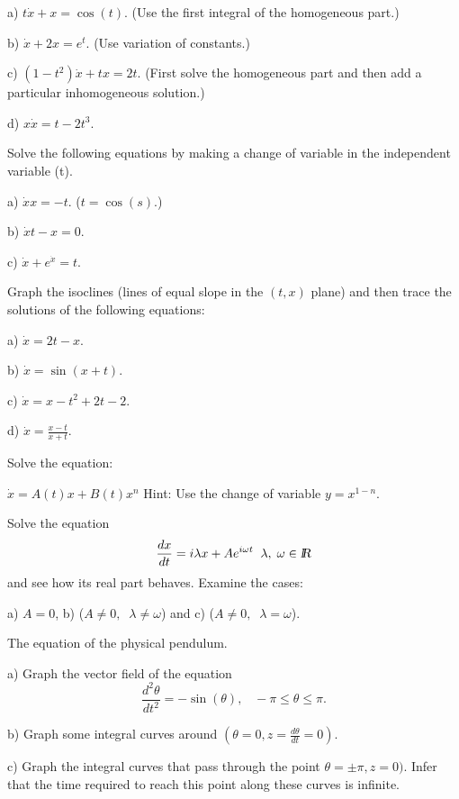 a) $t \dot{x} + x = \cos(t)$. (Use the first integral of the homogeneous part.)

b) $\dot{x} + 2x = e^t$. (Use variation of constants.)

c) $(1-t^2)\dot{x} + tx = 2t$. (First solve the homogeneous part and then
add a particular inhomogeneous solution.)

d) $x \dot{x} = t - 2t^3$.
\epro

\bpro[Kiseliov]
Solve the following equations by making a change of variable in
the independent variable (t).

a) $\dot{x}x = -t$. ($t = \cos(s)$.)

b) $\dot{x}t - x =0$.

c) $\dot{x} + e^{\dot{x}} = t$.
\epro

\bpro[Kiseliov]
Graph the isoclines (lines of equal slope in the $(t,x)$ plane)
and then trace the solutions of the following equations:

a) $\dot{x} = 2t - x$.

b) $\dot{x} = \sin(x+t)$.

c) $\dot{x} = x -t^2 + 2t -2$.

d) $\dot{x} = \frac{x-t}{x+t}$.
\epro

\bpro 
Solve the equation:

$\dot{x} = A(t)x + B(t)x^n$ Hint: Use the change of variable $y = x^{1-n}$.
\epro

\bpro 
Solve the equation
\begin{equation}
  \label{eq:osc}
  \frac{dx}{dt} = i\lambda x + A e^{i \omega t} \;\; \lambda, \; \omega \in \mbox{\sl {l$\!\!\!\;\:\!$R}}
\end{equation}
%
and see how its real part behaves.
Examine the cases: 

a) $A=0$, 
b) ($A \neq 0, \;\; \lambda \neq \omega$) and
c) ($A \neq 0, \;\; \lambda = \omega$).
\epro

\bpro 
The equation of the physical pendulum.

a) Graph the vector field of the equation
\begin{equation}
  \label{eq:pendulo_fisico}
  \frac{d^2\theta}{dt^2} = -\sin(\theta), \;\;\;-\pi \leq \theta \leq \pi. 
\end{equation}

b) Graph some integral curves around 
$(\theta=0, z=\frac{d\theta}{dt} = 0)$.

c) Graph the integral curves that pass through the point
$\theta = \pm \pi, z=0)$. Infer that the time required 
to reach this point along these curves is infinite.

